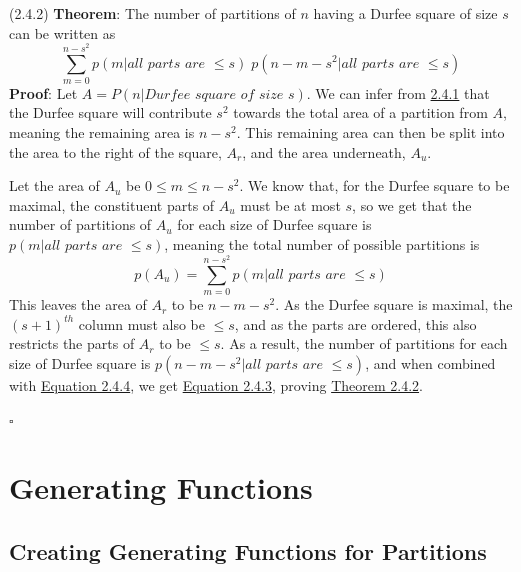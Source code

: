 \documentclass{article}
\newcommand{\separate}[1] {\vspace{#1 pt}\noindent}
\newcommand{\theorem}[2]{(#1) \textbf{Theorem}: #2}
\newcommand{\proof}[1]{\textbf{Proof}: #1 \begin{flushright}\(\square\)\end{flushright}}
\begin{document}
\separate{5}\theorem{2.4.2}{The number of partitions of \(n\) having a Durfee square of size \(s\) can be written as}\label{thm:2.4.2}
\begin{equation}\tag{2.4.3}\label{eq:2.4.3}
    \sum^{n-s^2}_{m=0}p(m | \textit{all parts are } \leq s) \; p(n-m-s^2 | \textit{all parts are } \leq s)
\end{equation}
\proof{Let \(A = P(n | \textit{Durfee square of size s})\). We can infer from \hyperref[def:2.4.1]{2.4.1} that the Durfee square will contribute \(s^2\) towards the total area of a partition from \(A\), meaning the remaining area is \(n-s^2\). This remaining area can then be split into the area to the right of the square, \(A_r\), and the area underneath, \(A_u\). 

Let the area of \(A_u\) be \(0 \leq m \leq n-s^2\). We know that, for the Durfee square to be maximal, the constituent parts of \(A_u\) must be at most \(s\), so we get that the number of partitions of \(A_u\) for each size of Durfee square is \(p(m | \textit{all parts are } \leq s)\), meaning the total number of possible partitions is
\begin{equation}\tag{2.4.4}\label{eq:2.4.4}
    p(A_u) = \sum^{n-s^2}_{m=0}p(m | \textit{all parts are } \leq s)
\end{equation}
This leaves the area of \(A_r\) to be \(n-m-s^2\). As the Durfee square is maximal, the \((s+1)^{th}\) column must also be \(\leq s\), and as the parts are ordered, this also restricts the parts of \(A_r\) to be \(\leq s\). As a result, the number of partitions for each size of Durfee square is \(p(n-m-s^2 | \textit{all parts are } \leq s)\), and when combined with \hyperref[eq:2.4.4]{Equation 2.4.4}, we get \hyperref[eq:2.4.3]{Equation 2.4.3}, proving \hyperref[thm:2.4.2]{Theorem 2.4.2}.}

\section{Generating Functions}

\subsection{Creating Generating Functions for Partitions}
\end{document}
